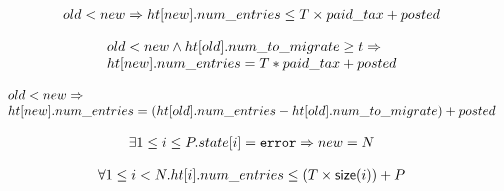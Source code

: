 \begin{lemma}
  \begin{equation*}
    \begin{array}{l}      
      old < new \Rightarrow \mbox{$ht[new]$}.num\_entries \leq T \times paid\_tax + posted
    \end{array}
  \end{equation*}  
  \label{upper_strengthening1}
\end{lemma}

\begin{lemma}
\begin{equation*}
\begin{array}{l}  
  old < new \wedge \mbox{$ht[old]$}.num\_to\_migrate \geq t \Rightarrow \\
  \mbox{$ht[new]$}.num\_entries = T * paid\_tax + posted
\end{array}
\end{equation*}
\label{upper_strengthening2}  
\end{lemma}

\begin{lemma}
  \begin{equation*}
    \begin{array}{l}  
      old < new \Rightarrow \\
  \mbox{$ht[new]$}.num\_entries = (\mbox{$ht[old]$}.num\_entries - \mbox{$ht[old]$}.num\_to\_migrate) + posted
\end{array}
\end{equation*}
  \label{upper_strengthening3}  
\end{lemma}

\begin{lemma}
  \begin{equation*}
\begin{array}{l}      
  \exists 1 \leq i \leq P. state[i] = \mbox{\texttt{error}} \Rightarrow new = N
\end{array}
\end{equation*}  
  \label{out_of_mem}  
\end{lemma}


\begin{lemma}
  \begin{equation*}
\begin{array}{l}      
  \forall 1 \leq i < N. \mbox{$ht[i]$}.num\_entries \leq (T \times \mathsf{size}(i)) + P
\end{array}
  \end{equation*}
  \label{upper_global}
\end{lemma}

